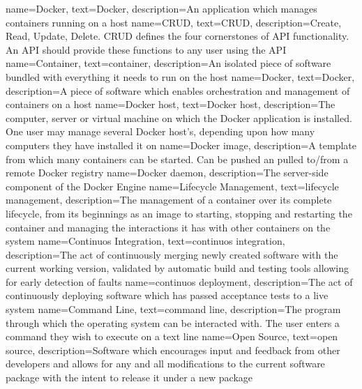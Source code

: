 {
    name={Docker},
    text={Docker},
    description={An application which manages containers running on a host}
}
{
    name={CRUD},
    text={CRUD},
    description={Create, Read, Update, Delete. CRUD defines the four cornerstones of API functionality. An API should provide these functions to any user using the API}
}
{
    name={Container},
    text={container},
    description={An isolated piece of software bundled with everything it needs to run on the host}
}
{
		name={Docker},
    text={Docker},
		description={A piece of software which enables orchestration and management of containers on a host}
}
{
		name={Docker host},
    text={Docker host},
		description={The computer, server or virtual machine on which the Docker application is installed. One user may manage several Docker host's, depending upon how many computers they have installed it on}
}
{
		name={Docker image},
		description={A template from which many containers can be started. Can be pushed an pulled to/from a remote Docker registry}
}
{
		name={Docker daemon},
		description={The server-side component of the Docker Engine}
}
{
		name={Lifecycle Management},
    text={lifecycle management},
		description={The management of a container over its complete lifecycle, from its beginnings as an image to starting, stopping and restarting the container and managing the interactions it has with other containers on the system}
}
{
		name={Continuos Integration},
    text={continuos integration},
		description={The act of continuously merging newly created software with the current working version, validated by automatic build and testing tools allowing for early detection of faults}
}
{
		name={continuos deployment},
		description={The act of continuously deploying software which has passed acceptance tests to a live system}
}
{
    name={Command Line},
    text={command line},
    description={The program through which the operating system can be interacted with. The user enters a command they wish to execute on a text line}
}
{
    name={Open Source},
    text={open source},
    description={Software which encourages input and feedback from other developers and allows for any and all modifications to the current software package with the intent to release it under a new package}
}
